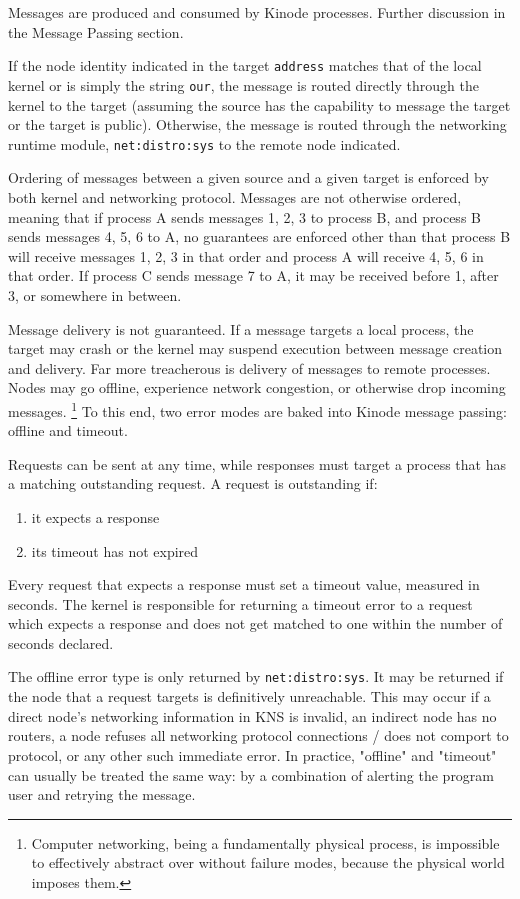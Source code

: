 \documentclass[runningheads]{llncs}
\begin{document}
Messages are produced and consumed by Kinode processes. Further discussion in the Message Passing section.

If the node identity indicated in the target \verb|address| matches that of the local kernel or is simply the string \verb|our|, the message is routed directly through the kernel to the target (assuming the source has the capability to message the target or the target is public).
Otherwise, the message is routed through the networking runtime module, \verb|net:distro:sys| to the remote node indicated.

Ordering of messages between a given source and a given target is enforced by both kernel and networking protocol.
Messages are not otherwise ordered, meaning that if process A sends messages 1, 2, 3 to process B, and process B sends messages 4, 5, 6 to A, no guarantees are enforced other than that process B will receive messages 1, 2, 3 in that order and process A will receive 4, 5, 6 in that order.
If process C sends message 7 to A, it may be received before 1, after 3, or somewhere in between.

Message delivery is not guaranteed.
If a message targets a local process, the target may crash or the kernel may suspend execution between message creation and delivery.
Far more treacherous is delivery of messages to remote processes.
Nodes may go offline, experience network congestion, or otherwise drop incoming messages.
\footnote{Computer networking, being a fundamentally physical process, is impossible to effectively abstract over without failure modes, because the physical world imposes them.}
To this end, two error modes are baked into Kinode message passing: offline and timeout.

Requests can be sent at any time, while responses must target a process that has a matching outstanding request.
A request is outstanding if:
\begin{enumerate}
    \item it expects a response
    \item its timeout has not expired
\end{enumerate}
Every request that expects a response must set a timeout value, measured in seconds.
The kernel is responsible for returning a timeout error to a request which expects a response and does not get matched to one within the number of seconds declared.

The offline error type is only returned by \verb|net:distro:sys|.
It may be returned if the node that a request targets is definitively unreachable.
This may occur if a direct node's networking information in KNS is invalid, an indirect node has no routers, a node refuses all networking protocol connections / does not comport to protocol, or any other such immediate error.
In practice, "offline" and "timeout" can usually be treated the same way: by a combination of alerting the program user and retrying the message.
\end{document}
